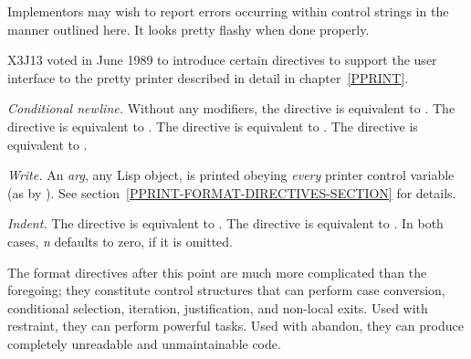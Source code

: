 \begin{flushdesc}
\beforenoterule
\begin{implementation}
Implementors may wish to report errors occurring
within  control strings in the manner outlined here.
It looks pretty flashy when done properly.
\end{implementation}
\afternoterule
\end{flushdesc}

\begin{new}
X3J13 voted in June 1989  to introduce
certain  directives to support the user interface to the pretty
printer described in detail in chapter~\ref{PPRINT}.

\begin{flushdesc}
\item[\cd{{\Xtilde}{\Xunderscore}}]
\emph{Conditional newline.} Without any modifiers, the directive
\cd{{\Xtilde}{\Xunderscore}} is equivalent to
.  The directive
\cd{{\Xtilde}{\Xatsign}{\Xunderscore}} is
equivalent to .  The directive
\cd{{\Xtilde}:{\Xunderscore}}
is equivalent to .  The directive
\cd{{\Xtilde}:{\Xatsign}{\Xunderscore}} is
equivalent to .

\item[\cd{{\Xtilde}W}]
\emph{Write.}  An \emph{arg}, any Lisp object, is printed obeying \emph{every}
printer control variable (as by ).
See section~\ref{PPRINT-FORMAT-DIRECTIVES-SECTION} for details.

\item[\cd{{\Xtilde}I}]
\emph{Indent.} The directive  is equivalent to
.  The directive  is equivalent to
.  In both cases, \emph{n} defaults to zero,
if it is omitted.
\end{flushdesc}
\end{new}

The format directives after this point are much more complicated than the
foregoing; they constitute control structures that can perform
case conversion,
conditional selection, iteration, justification, and non-local exits.
Used with restraint, they can perform powerful tasks.  Used with
abandon, they can produce completely unreadable and unmaintainable code.

